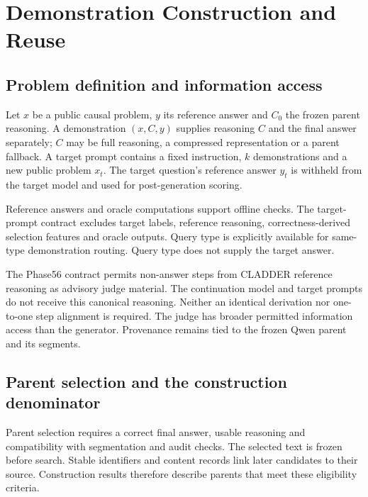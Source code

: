 \chapter{Demonstration Construction and Reuse}\label{ch:3}

\section{Problem definition and information access}\label{sec:3.1}

Let $x$ be a public causal problem, $y$ its reference answer and $C_0$ the frozen parent reasoning. A demonstration $(x,C,y)$ supplies reasoning $C$ and the final answer separately; $C$ may be full reasoning, a compressed representation or a parent fallback. A target prompt contains a fixed instruction, $k$ demonstrations and a new public problem $x_t$. The target question's reference answer $y_t$ is withheld from the target model and used for post-generation scoring.

Reference answers and oracle computations support offline checks. The target-prompt contract excludes target labels, reference reasoning, correctness-derived selection features and oracle outputs. Query type is explicitly available for same-type demonstration routing. Query type does not supply the target answer.

The Phase56 contract permits non-answer steps from CLADDER reference reasoning as advisory judge material. The continuation model and target prompts do not receive this canonical reasoning. Neither an identical derivation nor one-to-one step alignment is required. The judge has broader permitted information access than the generator. Provenance remains tied to the frozen Qwen parent and its segments.

\section{Parent selection and the construction denominator}\label{sec:3.2}

Parent selection requires a correct final answer, usable reasoning and compatibility with segmentation and audit checks. The selected text is frozen before search. Stable identifiers and content records link later candidates to their source. Construction results therefore describe parents that meet these eligibility criteria.


